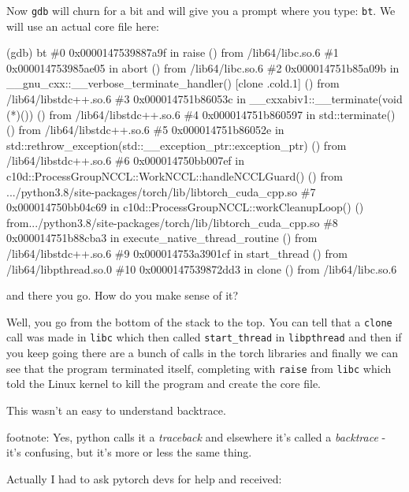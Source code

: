 \documentclass[
]{report}
\newenvironment{Shaded}{\begin{snugshade}}{\end{snugshade}}
\newcommand{\CommentTok}[1]{\textcolor[rgb]{0.37,0.37,0.37}{#1}}
\newcommand{\ExtensionTok}[1]{\textcolor[rgb]{0.00,0.23,0.31}{#1}}
\newcommand{\FunctionTok}[1]{\textcolor[rgb]{0.28,0.35,0.67}{#1}}
\newcommand{\KeywordTok}[1]{\textcolor[rgb]{0.00,0.23,0.31}{#1}}
\newcommand{\NormalTok}[1]{\textcolor[rgb]{0.00,0.23,0.31}{#1}}
\begin{document}
Now \texttt{gdb} will churn for a bit and will give you a prompt where
you type: \texttt{bt}. We will use an actual core file here:

\begin{Shaded}
\begin{Highlighting}[]
\KeywordTok{(}\FunctionTok{gdb}\KeywordTok{)} \ExtensionTok{bt}
\CommentTok{\#0  0x0000147539887a9f in raise () from /lib64/libc.so.6}
\CommentTok{\#1  0x000014753985ae05 in abort () from /lib64/libc.so.6}
\CommentTok{\#2  0x000014751b85a09b in \_\_gnu\_cxx::\_\_verbose\_terminate\_handler() [clone .cold.1] () from /lib64/libstdc++.so.6}
\CommentTok{\#3  0x000014751b86053c in \_\_cxxabiv1::\_\_terminate(void (*)()) () from /lib64/libstdc++.so.6}
\CommentTok{\#4  0x000014751b860597 in std::terminate() () from /lib64/libstdc++.so.6}
\CommentTok{\#5  0x000014751b86052e in std::rethrow\_exception(std::\_\_exception\_ptr::exception\_ptr) () from /lib64/libstdc++.so.6}
\CommentTok{\#6  0x000014750bb007ef in c10d::ProcessGroupNCCL::WorkNCCL::handleNCCLGuard() ()}
   \ExtensionTok{from}\NormalTok{ .../python3.8/site{-}packages/torch/lib/libtorch\_cuda\_cpp.so}
\CommentTok{\#7  0x000014750bb04c69 in c10d::ProcessGroupNCCL::workCleanupLoop() ()}
   \ExtensionTok{from.../python3.8/site{-}packages/torch/lib/libtorch\_cuda\_cpp.so}
\CommentTok{\#8  0x000014751b88cba3 in execute\_native\_thread\_routine () from /lib64/libstdc++.so.6}
\CommentTok{\#9  0x000014753a3901cf in start\_thread () from /lib64/libpthread.so.0}
\CommentTok{\#10 0x0000147539872dd3 in clone () from /lib64/libc.so.6}
\end{Highlighting}
\end{Shaded}

and there you go. How do you make sense of it?

Well, you go from the bottom of the stack to the top. You can tell that
a \texttt{clone} call was made in \texttt{libc} which then called
\texttt{start\_thread} in \texttt{libpthread} and then if you keep going
there are a bunch of calls in the torch libraries and finally we can see
that the program terminated itself, completing with \texttt{raise} from
\texttt{libc} which told the Linux kernel to kill the program and create
the core file.

This wasn't an easy to understand backtrace.

footnote: Yes, python calls it a \emph{traceback} and elsewhere it's
called a \emph{backtrace} - it's confusing, but it's more or less the
same thing.

Actually I had to ask pytorch devs for help and received:
\end{document}
